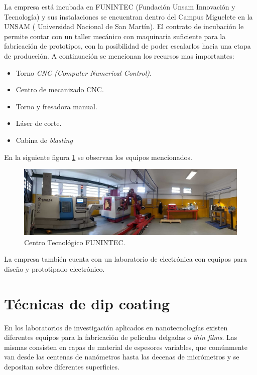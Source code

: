 La empresa está incubada en FUNINTEC (Fundación Unsam Innovación y Tecnología) y sus instalaciones se encuentran dentro del Campus Miguelete en la UNSAM ( Universidad Nacional de San Martín). El contrato de incubación le permite contar con un taller mecánico con maquinaria suficiente para la fabricación de  prototipos, con la posibilidad de poder escalarlos hacia una etapa de producción. A continuación se mencionan los recursos mas importantes:
 
\begin{itemize}
\item Torno \textit{CNC (Computer Numerical Control)}.
\item Centro de mecanizado CNC.
\item Torno y fresadora manual.
\item Láser de corte.
\item Cabina de \textit{blasting}
\end{itemize}

En la siguiente figura \ref{fig:taller} se observan los equipos mencionados.

\begin{figure}[htpb]
\centering 
\includegraphics[width=1\textwidth]{./Figures/taller.jpg}
\caption{Centro Tecnológico FUNINTEC.}
\label{fig:taller}
\end{figure}

La empresa también cuenta con un laboratorio de electrónica con equipos para diseño y prototipado electrónico.

\section{Técnicas de dip coating}

En los laboratorios de investigación aplicados en nanotecnologías existen diferentes equipos para la fabricación de películas delgadas o \textit{thin films}. Las mismas consisten en capas de material de espesores variables, que comúnmente van desde las centenas de nanómetros hasta las decenas de micrómetros y se depositan sobre diferentes superficies.


